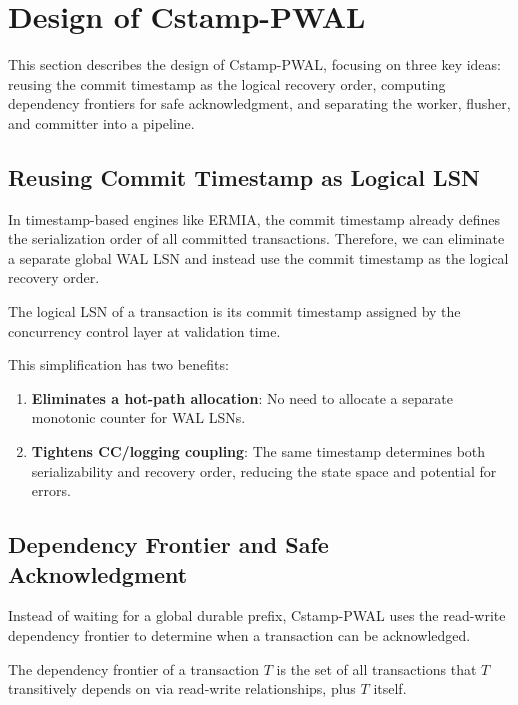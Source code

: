 \section{Design of Cstamp-PWAL}
\label{sec:design}

This section describes the design of Cstamp-PWAL, focusing on three key ideas:
reusing the commit timestamp as the logical recovery order, computing dependency
frontiers for safe acknowledgment, and separating the worker, flusher, and
committer into a pipeline.

\subsection{Reusing Commit Timestamp as Logical LSN}

In timestamp-based engines like ERMIA, the commit timestamp already defines the
serialization order of all committed transactions.  Therefore, we can eliminate a
separate global WAL LSN and instead use the commit timestamp as the logical
recovery order.

\begin{definition}
The logical LSN of a transaction is its commit timestamp assigned by the
concurrency control layer at validation time.
\end{definition}

This simplification has two benefits:

\begin{enumerate}
  \item \textbf{Eliminates a hot-path allocation}: No need to allocate a separate
        monotonic counter for WAL LSNs.
  \item \textbf{Tightens CC/logging coupling}: The same timestamp determines both
        serializability and recovery order, reducing the state space and potential
        for errors.
\end{enumerate}

\subsection{Dependency Frontier and Safe Acknowledgment}

Instead of waiting for a global durable prefix, Cstamp-PWAL uses the read-write
dependency frontier to determine when a transaction can be acknowledged.

\begin{definition}
The dependency frontier of a transaction $T$ is the set of all transactions that
$T$ transitively depends on via read-write relationships, plus $T$ itself.
\end{definition}

